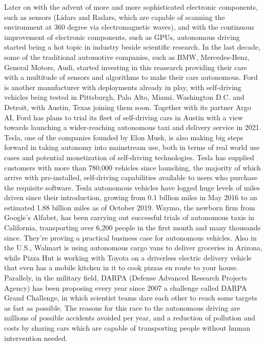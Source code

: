 Later on with the advent of more and more sophisticated electronic components, such as sensors (Lidars and Radars, which are capable of scanning the environment at 360 degree via electromagnetic waves), and with the continuous improvement of electronic components, such as GPUs, autonomous driving started being a hot topic in industry beside scientific research.
In the last decade, some of the traditional automotive companies, such as BMW, Mercedes-Benz, General Motors, Audi, started investing in this reasearch providing their cars with a multitude of sensors and algorithms to make their cars autonomous. Ford is another manufacturer with deployments already in play, with self-driving vehicles being tested in Pittsburgh, Palo Alto, Miami, Washington D.C. and Detroit, with Austin, Texas joining them soon. Together with its partner Argo AI, Ford has plans to trial its fleet of self-driving cars in Austin with a view towards launching a wider-reaching autonomous taxi and delivery service in 2021.
Tesla, one of the companies founded by Elon Musk, is also making big steps forward in taking autonomy into mainstream use, both in terms of real world use cases and potential monetization of self-driving technologies. Tesla has supplied customers with more than 780,000 vehicles since launching, the majority of which arrive with pre-installed, self-driving capabilities available to users who purchase the requisite software. Tesla autonomous vehicles have logged huge levels of miles driven since their introduction, growing from 0.1 billion miles in May 2016 to an estimated 1.88 billion miles as of October 2019.
Waymo, the newborn firm from Google's Alfabet, has been carrying out successful trials of autonomous taxis in California, transporting over 6,200 people in the first month and many thousands since. They're proving a practical business case for autonomous vehicles.
Also in the U.S., Walmart is using autonomous cargo vans to deliver groceries in Arizona, while Pizza Hut is working with Toyota on a driverless electric delivery vehicle that even has a mobile kitchen in it to cook pizzas en route to your house.
Parallely, in the military field, DARPA (Defense Advanced Research Projects Agency) has been proposing every year since 2007 a challenge called DARPA Grand Challenge, in which scientist teams dare each other to reach some targets as fast as possible.
The reasons for this race to the autonomous driving are millions of possible accidents avoided per year, and a reduction of pollution and costs by sharing cars which are capable of transporting people without human intervention needed. %
